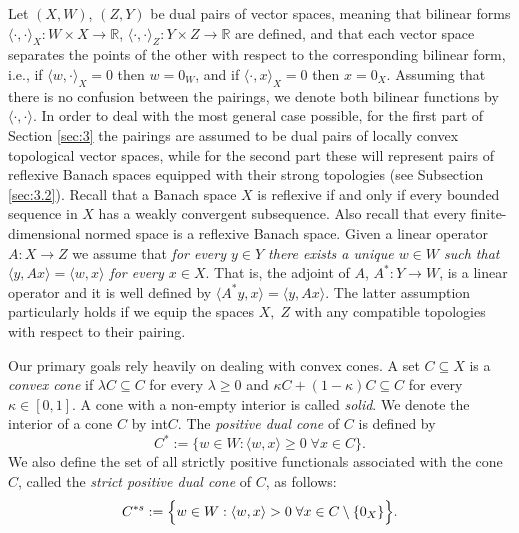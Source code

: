 \documentclass[11pt, twoside]{article}
\numberwithin{equation}{section}
\theoremstyle{definition}
\begin{document}
Let $(X,W)$, $(Z,Y)$ be dual pairs of vector spaces, meaning that bilinear forms $\langle\cdot,\cdot\rangle_X:W\times X\rightarrow\mathbb{R}$, $\langle\cdot,\cdot\rangle_Z:Y\times Z\rightarrow\mathbb{R}$ are defined, and that each vector space separates the points of the other with respect to the corresponding bilinear form, i.e., if $\langle w,\cdot\rangle_X=0$ then $w=0_W$, and if $\langle\cdot,x\rangle_X=0$ then $x=0_X$. Assuming that there is no confusion between the pairings, we denote both bilinear functions by $\langle\cdot,\cdot\rangle$. In order to deal with the most general case possible, for the first part of Section \ref{sec:3} the pairings are assumed to be dual pairs of locally convex topological vector spaces, while for the second part these will represent pairs of reflexive Banach spaces equipped with their strong topologies (see Subsection \ref{sec:3.2}). Recall that a Banach space $X$ is reflexive if and only if every bounded sequence in $X$
has a weakly convergent subsequence. Also recall that every finite-dimensional normed space is a reflexive Banach space. Given a linear operator $A:X\rightarrow Z$ we assume that \textit{for every $y\in Y$ there exists a unique $w\in W$ such that $\langle y,Ax\rangle=\langle w,x\rangle$ for every $x\in X$}. That is, the adjoint of $A$, $A^*:Y\rightarrow W$, is a linear operator and it is well defined by $\langle A^*y,x\rangle=\langle y,Ax\rangle$.  The latter assumption particularly holds if we equip the spaces $X,\;Z$ with any compatible topologies with respect to their pairing.\par

 Our primary goals rely heavily on dealing with convex cones. A set $C\subseteq X$ is a \textit{convex cone} if $\lambda C\subseteq C$ for every $\lambda\geq0$ and $\kappa C+(1-\kappa)C\subseteq C$ for every $\kappa\in[0,1]$. A cone with a non-empty interior is called \textit{solid}. We denote the interior of a cone $C$ by int$C$. The \textit{positive dual cone} of $C$ is defined by
\begin{equation*}
    C^*:= \bigl\{w\in W:\langle w,x\rangle \geq0\;\forall x\in C\bigr\}.
\end{equation*}
 We also define the set of all strictly positive functionals associated with the cone $C$, called the \textit{strict positive dual cone} of $C$, as follows:
\begin{equation*}
    C^{*s}:= \Bigl\{w\in W:\langle w,x\rangle>0\;\forall x\in C\setminus\{0_X\}\Bigr\}.
\end{equation*}
\end{document}
